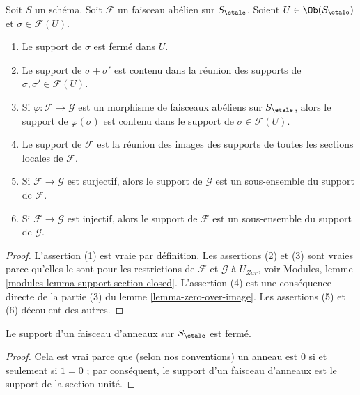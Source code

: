 \begin{lemma}
\label{lemma-support-section-closed}
Soit $S$ un sch\'ema.
Soit $\mathcal{F}$ un faisceau ab\'elien sur $S_\etale$.
Soient $U \in \Ob(S_\etale)$ et $\sigma \in \mathcal{F}(U)$.
\begin{enumerate}
\item Le support de $\sigma$ est ferm\'e dans $U$.
\item Le support de $\sigma + \sigma'$ est contenu dans la r\'eunion des
supports de $\sigma, \sigma' \in \mathcal{F}(U)$.
\item Si $\varphi : \mathcal{F} \to \mathcal{G}$ est un morphisme de
faisceaux ab\'eliens sur $S_\etale$, alors le support de $\varphi(\sigma)$
est contenu dans le support de $\sigma \in \mathcal{F}(U)$.
\item Le support de $\mathcal{F}$ est la r\'eunion des images des
supports de toutes les sections locales de $\mathcal{F}$.
\item Si $\mathcal{F} \to \mathcal{G}$ est surjectif, alors le support
de $\mathcal{G}$ est un sous-ensemble du support de $\mathcal{F}$.
\item Si $\mathcal{F} \to \mathcal{G}$ est injectif, alors le support
de $\mathcal{F}$ est un sous-ensemble du support de $\mathcal{G}$.
\end{enumerate}
\end{lemma}

\begin{proof}
L'assertion (1) est vraie par d\'efinition.
Les assertions (2) et (3) sont vraies parce qu'elles le sont pour les restrictions de
$\mathcal{F}$ et $\mathcal{G}$ \`a $U_{Zar}$, voir
Modules, lemme \ref{modules-lemma-support-section-closed}.
L'assertion (4) est une cons\'equence directe de la partie (3) du
lemme \ref{lemma-zero-over-image}.
Les assertions (5) et (6) d\'ecoulent des autres.
\end{proof}

\begin{lemma}
\label{lemma-support-sheaf-rings-closed}
Le support d'un faisceau d'anneaux sur $S_\etale$ est ferm\'e.
\end{lemma}

\begin{proof}
Cela est vrai parce que (selon nos conventions)
un anneau est $0$ si et seulement si
$1 = 0$ ; par cons\'equent, le support d'un faisceau d'anneaux
est le support de la section unit\'e.
\end{proof}




